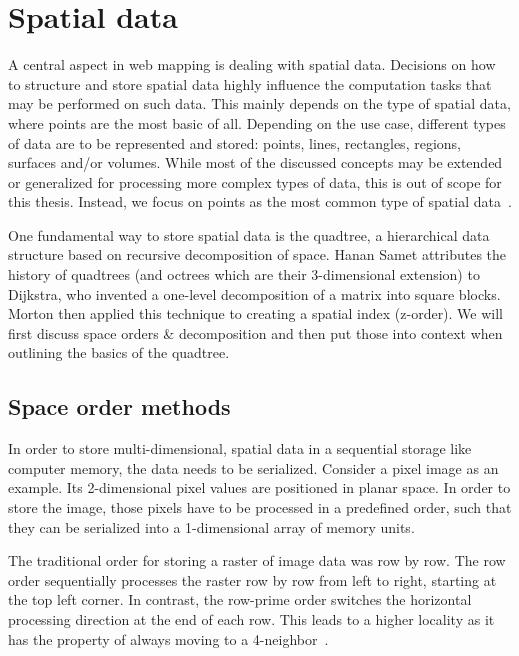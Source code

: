 
%
%

\section{Spatial data}

A central aspect in web mapping is dealing with spatial data. Decisions on how to structure and store spatial data highly influence the computation tasks that may be performed on such data. This mainly depends on the type of spatial data, where points are the most basic of all. Depending on the use case, different types of data are to be represented and stored: points, lines, rectangles, regions, surfaces and/or volumes. While most of the discussed concepts may be extended or generalized for processing more complex types of data, this is out of scope for this thesis. Instead, we focus on points as the most common type of spatial data~\cite{Samet90spatialdata}.

One fundamental way to store spatial data is the quadtree, a hierarchical data structure based on recursive decomposition of space. Hanan Samet attributes the history of quadtrees (and octrees which are their 3-dimensional extension) to Dijkstra, who invented a one-level decomposition of a matrix into square blocks. Morton then applied this technique to creating a spatial index (z-order). We will first discuss space orders \& decomposition and then put those into context when outlining the basics of the quadtree.


\subsection{Space order methods}
\label{chapter:space-order}

In order to store multi-dimensional, spatial data in a sequential storage like computer memory, the data needs to be serialized. Consider a pixel image as an example. Its 2-dimensional pixel values are positioned in planar space. In order to store the image, those pixels have to be processed in a predefined order, such that they can be serialized into a 1-dimensional array of memory units.

The traditional order for storing a raster of image data was row by row. The row order sequentially processes the raster row by row from left to right, starting at the top left corner. In contrast, the row-prime order switches the horizontal processing direction at the end of each row. This leads to a higher locality as it has the property of always moving to a 4-neighbor~\cite{Goodchild83raster}.

